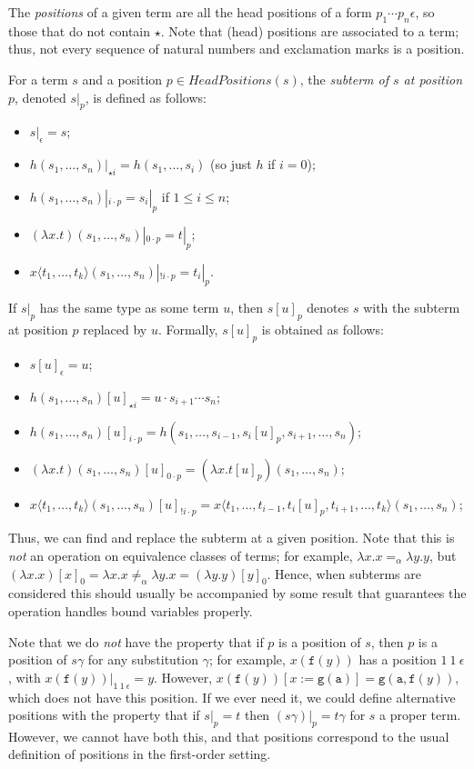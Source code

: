 \documentclass{lmcs}
\theoremstyle{theorem}\newtheorem{theorem}{Theorem}
\theoremstyle{theorem}\newtheorem{lemma}[theorem]{Lemma}
\theoremstyle{theorem}\newtheorem{corollary}[theorem]{Corollary}
\theoremstyle{definition}\newtheorem{definition}[theorem]{Definition}
\theoremstyle{definition}\newtheorem{example}[theorem]{Example}
\newcommand{\HeadPositions}{\mathit{HeadPositions}}
\newcommand{\identifier}[1]{\mathtt{#1}}
\newcommand{\afun}{\identifier{f}}
\newcommand{\bfun}{\identifier{g}}
\newcommand{\avar}{x}
\newcommand{\abs}[2]{\lambda #1.#2}
\newcommand{\meta}[2]{#1\langle#2\rangle}
\begin{document}
The \emph{positions} of a given term are all the head positions of a form $p_1 \cdots p_n \epsilon$,
so those that do not contain $\star$.
Note that (head) positions are associated to a term; thus, not every sequence of natural numbers
and exclamation marks is a position.

For a term $s$ and a position $p \in \HeadPositions(s)$, the \emph{subterm of $s$ at position $p$},
denoted $s|_p$, is defined as follows:
\begin{itemize}
\item $s|_\epsilon = s$;
\item $h(s_1,\dots,s_n)|_{\star i} = h(s_1,\dots,s_i)$ (so just $h$ if $i = 0$);
\item $h(s_1,\dots,s_n)|_{i \cdot p} = s_i|_p$ if $1 \leq i \leq n$;
\item $(\abs{\avar}{t})(s_1,\dots,s_n)|_{0 \cdot p} = t|_p$;
\item $\meta{\avar}{t_1,\dots,t_k}(s_1,\dots,s_n)|_{!i \cdot p} = t_i|_p$.
\end{itemize}

If $s|_p$ has the same type as some term $u$, then $s[u]_p$ denotes $s$ with the subterm at position
$p$ replaced by $u$.  Formally, $s[u]_p$ is obtained as follows:
\begin{itemize}
\item $s[u]_\epsilon = u$;
\item $h(s_1,\dots,s_n)[u]_{\star i} = u \cdot s_{i+1} \cdots s_n$;
\item $h(s_1,\dots,s_n)[u]_{i \cdot p} = h(s_1,\dots,s_{i-1},s_i[u]_p,s_{i+1},\dots,s_n)$;
\item $(\abs{\avar}{t})(s_1,\dots,s_n)[u]_{0 \cdot p} = (\abs{\avar}{t[u]_p})(s_1,\dots,s_n)$;
\item $\meta{x}{t_1,\dots,t_k}(s_1,\dots,s_n)[u]_{!i \cdot p} = \meta{x}{t_1,\dots,t_{i-1},t_i[u]_p,t_{i+1},\dots,t_k}(s_1,\dots,s_n)$;
\end{itemize}
Thus, we can find and replace the subterm at a given position.
Note that this is \emph{not} an operation on equivalence classes of terms; for example,
$\abs{x}{x} =_\alpha \abs{y}{y}$, but $(\abs{x}{x})[x]_0 = \abs{x}{x} \not =_\alpha
\abs{y}{x} = (\abs{y}{y})[y]_0$.  Hence, when subterms are considered this should usually be
accompanied by some result that guarantees the operation handles bound variables properly.

Note that we do \emph{not} have the property that if $p$ is a position of $s$, then $p$ is a
position of $s\gamma$ for any substitution $\gamma$; for example, $x(\afun(y))$ has a position
$1\ 1\ \epsilon$, with $x(\afun(y))|_{1\ 1\ \epsilon} = y$.  However,
$x(\afun(y))[x:=\bfun(\identifier{a})] = \bfun(\identifier{a},\afun(y))$, which does not have this
position.  If we ever need it, we could define alternative positions with the property that
if $s|_p = t$ then $(s\gamma)|_p = t\gamma$ for $s$ a proper term.  However, we cannot have both
this, and that positions correspond to the usual definition of positions in the first-order setting.
\end{document}
